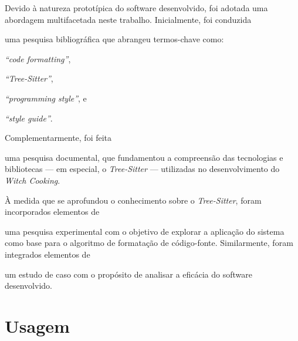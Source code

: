 \documentclass
  [11pt,a4paper,english,brazil,openright,sumario=tradicional,twoside]
  {abntex2}
\newcommand{\treesitter}{\textit{Tree-Sitter}\xspace}
\newcommand{\witchcooking}{\textit{Witch Cooking}\xspace}
\begin{document}
  Devido à natureza prototípica do software desenvolvido, foi adotada uma
  abordagem multifacetada neste trabalho. Inicialmente, foi conduzida
  \begin{inparaenum}
    \item uma pesquisa bibliográfica que abrangeu termos-chave como:
          \begin{inparaenum}
            \item \textit{``code formatting''},
            \item \textit{``Tree-Sitter''},
            \item \textit{``programming style''}, e
            \item \textit{``style guide''}.
          \end{inparaenum}
          Complementarmente, foi feita
    \item uma pesquisa documental, que fundamentou a compreensão das
          tecnologias e bibliotecas --- em especial, o \treesitter{} ---
          utilizadas no desenvolvimento do \witchcooking.

          À medida que se aprofundou o conhecimento sobre o \treesitter, foram
          incorporados elementos de
    \item uma pesquisa experimental com o objetivo de explorar a aplicação do
          sistema como base para o algoritmo de formatação de código-fonte.
          Similarmente, foram integrados elementos de
    \item um estudo de caso com o propósito de analisar a eficácia do software
          desenvolvido.
  \end{inparaenum}


  \section{Usagem}
  \label{section:usage}
\end{document}
